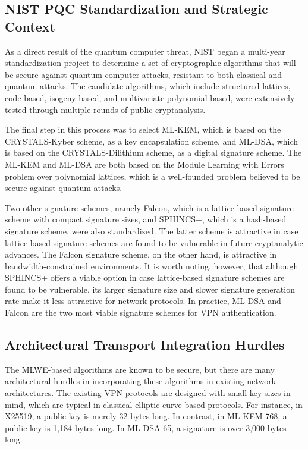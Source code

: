 \documentclass[10pt, conference, letterpaper]{IEEEtran}
\begin{document}
\subsection{NIST PQC Standardization and Strategic Context}
As a direct result of the quantum computer threat, NIST began a multi-year standardization project to determine a set of cryptographic algorithms that will be secure against quantum computer attacks, resistant to both classical and quantum attacks. The candidate algorithms, which include structured lattices, code-based, isogeny-based, and multivariate polynomial-based, were extensively tested through multiple rounds of public cryptanalysis.

The final step in this process was to select ML-KEM, which is based on the CRYSTALS-Kyber scheme, as a key encapsulation scheme, and ML-DSA, which is based on the CRYSTALS-Dilithium scheme, as a digital signature scheme. The ML-KEM and ML-DSA are both based on the Module Learning with Errors problem over polynomial lattices, which is a well-founded problem believed to be secure against quantum attacks.

Two other signature schemes, namely Falcon, which is a lattice-based signature scheme with compact signature sizes, and SPHINCS+, which is a hash-based signature scheme, were also standardized. The latter scheme is attractive in case lattice-based signature schemes are found to be vulnerable in future cryptanalytic advances. The Falcon signature scheme, on the other hand, is attractive in bandwidth-constrained environments. It is worth noting, however, that although SPHINCS+ offers a viable option in case lattice-based signature schemes are found to be vulnerable, its larger signature size and slower signature generation rate make it less attractive for network protocols. In practice, ML-DSA and Falcon are the two most viable signature schemes for VPN authentication.

\subsection{Architectural Transport Integration Hurdles}
The MLWE-based algorithms are known to be secure, but there are many architectural hurdles in incorporating these algorithms in existing network architectures. The existing VPN protocols are designed with small key sizes in mind, which are typical in classical elliptic curve-based protocols. For instance, in X25519, a public key is merely 32 bytes long. In contrast, in ML-KEM-768, a public key is 1,184 bytes long. In ML-DSA-65, a signature is over 3,000 bytes long.
\end{document}
